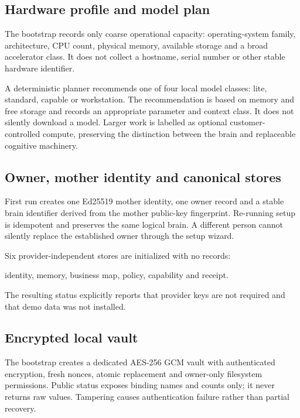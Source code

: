 \subsection{Hardware profile and model plan}

The bootstrap records only coarse operational capacity: operating-system family,
architecture, CPU count, physical memory, available storage and a broad
accelerator class.  It does not collect a hostname, serial number or other stable
hardware identifier.

A deterministic planner recommends one of four local model classes: lite,
standard, capable or workstation.  The recommendation is based on memory and
free storage and records an appropriate parameter and context class.  It does
not silently download a model.  Larger work is labelled as optional
customer-controlled compute, preserving the distinction between the brain and
replaceable cognitive machinery.

\subsection{Owner, mother identity and canonical stores}

First run creates one Ed25519 mother identity, one owner record and a stable brain
identifier derived from the mother public-key fingerprint.  Re-running setup is
idempotent and preserves the same logical brain.  A different person cannot
silently replace the established owner through the setup wizard.

Six provider-independent stores are initialized with no records:

\begin{center}
identity, memory, business map, policy, capability and receipt.
\end{center}

The resulting status explicitly reports that provider keys are not required and
that demo data was not installed.

\subsection{Encrypted local vault}

The bootstrap creates a dedicated AES-256 GCM vault with authenticated
encryption, fresh nonces, atomic replacement and owner-only filesystem
permissions.  Public status exposes binding names and counts only; it never
returns raw values.  Tampering causes authentication failure rather than partial
recovery.

